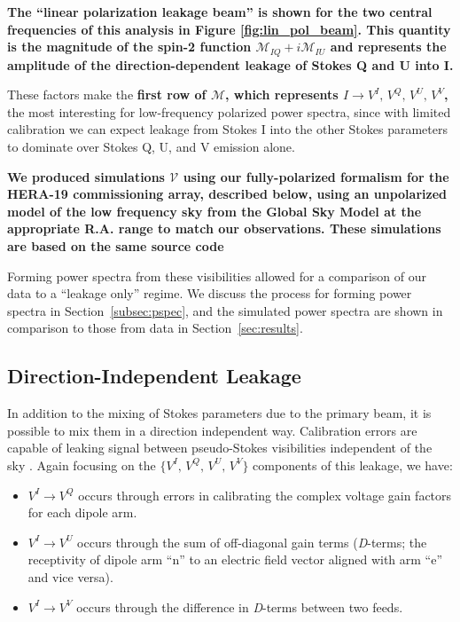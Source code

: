 \documentclass[twocolumn, trackchanges]{aastex61}
\newcommand{\edited}[1]{{\bf \color{red} #1}}
\begin{document}
\edited{The ``linear polarization leakage beam'' is shown for the two central frequencies of this analysis in Figure \ref{fig:lin_pol_beam}.   This quantity is the magnitude of the spin-2 function $\mathcal{M}_{IQ} + i \mathcal{M}_{IU}$ and represents the amplitude of the direction-dependent leakage of Stokes Q and U into I.}

These factors make the \edited{first row of $\mathcal{M}$, which represents $I\rightarrow V^I,\,V^Q,\,V^U,\,V^V$,} the most interesting for low-frequency polarized power spectra, since with limited calibration we can expect leakage from Stokes I into the other Stokes parameters to dominate over Stokes Q, U, and V emission alone. 

\edited{We produced simulations $\mathcal{V}$ using our fully-polarized formalism for the HERA-19 commissioning array, described below, using an unpolarized model of the low frequency sky from the Global Sky Model \citep[GSM;][]{GSM.08, pygsm, GSM.17} at the appropriate R.A. range to match our observations. These simulations are based on the same source code }

Forming power spectra from these visibilities allowed for a comparison of our data to a ``leakage only'' regime. We discuss the process for forming power spectra in Section~\ref{subsec:pspec}, and the simulated power spectra are shown in comparison to those from data in Section~\ref{sec:results}.

\subsection{Direction-Independent Leakage}
\label{subsec:DI-Leak}

In addition to the mixing of Stokes parameters due to the primary beam, it is possible to mix them in a direction independent way. Calibration errors are capable of leaking signal between pseudo-Stokes visibilities independent of the sky \citep{TMS}. Again focusing on the $\{V^I,\,V^Q,\,V^U,\,V^V\}$ components of this leakage, we have:
\begin{itemize}
\item $V^I \rightarrow V^Q$ occurs through errors in calibrating the complex voltage gain factors for each dipole arm.
\item $V^I \rightarrow V^U$ occurs through the sum of off-diagonal gain terms (\textit{D}-terms; the receptivity of dipole arm ``n'' to an electric field vector aligned with arm ``e'' and vice versa).
\item $V^I \rightarrow V^V$ occurs through the difference in \textit{D}-terms between two feeds.
\end{itemize}
\end{document}
